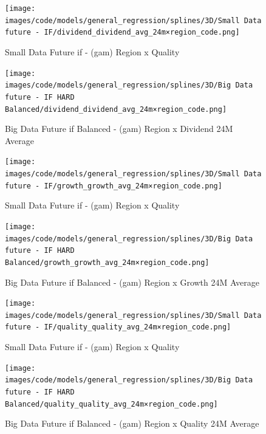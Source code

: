 \documentclass[11pt,english,a4paper,hidelinks]{book}
\begin{document}
\begin{figure}[H]
    \centering
    \begin{minipage}{0.48\textwidth}
        \centering
        \texttt{[image: images/code/models/general\_regression/splines/3D/Small Data future - IF/dividend\_dividend\_avg\_24m×region\_code.png]}
        \caption{Small Data Future \acrshort{if} - (\acrshort{gam}) Region x Quality}
        \label{fig:small_tensor_region_dividend_avg_24m}
    \end{minipage}
    \begin{minipage}{0.48\textwidth}
        \centering
        \texttt{[image: images/code/models/general\_regression/splines/3D/Big Data future - IF HARD Balanced/dividend\_dividend\_avg\_24m×region\_code.png]}
        \caption{Big Data Future \acrshort{if} Balanced - (\acrshort{gam}) Region x Dividend 24M Average}
        \label{fig:tensor_region_dividend_avg_24m}
    \end{minipage}\hfill
\end{figure}

\begin{figure}[H]
    \centering
    \begin{minipage}{0.48\textwidth}
        \centering
        \texttt{[image: images/code/models/general\_regression/splines/3D/Small Data future - IF/growth\_growth\_avg\_24m×region\_code.png]}
        \caption{Small Data Future \acrshort{if} - (\acrshort{gam}) Region x Quality}
        \label{fig:small_tensor_region_growth_avg_24m}
    \end{minipage}
    \begin{minipage}{0.48\textwidth}
        \centering
        \texttt{[image: images/code/models/general\_regression/splines/3D/Big Data future - IF HARD Balanced/growth\_growth\_avg\_24m×region\_code.png]}
        \caption{Big Data Future \acrshort{if} Balanced - (\acrshort{gam}) Region x Growth 24M Average}
        \label{fig:tensor_region_growth_avg_24m}
    \end{minipage}\hfill
\end{figure}

\begin{figure}[H]
    \centering
    \begin{minipage}{0.48\textwidth}
        \centering
        \texttt{[image: images/code/models/general\_regression/splines/3D/Small Data future - IF/quality\_quality\_avg\_24m×region\_code.png]}
        \caption{Small Data Future \acrshort{if} - (\acrshort{gam}) Region x Quality}
        \label{fig:small_tensor_region_quality_avg_24m}
    \end{minipage}
    \begin{minipage}{0.48\textwidth}
        \centering
        \texttt{[image: images/code/models/general\_regression/splines/3D/Big Data future - IF HARD Balanced/quality\_quality\_avg\_24m×region\_code.png]}
        \caption{Big Data Future \acrshort{if} Balanced - (\acrshort{gam}) Region x Quality 24M Average}
        \label{fig:tensor_region_quality_avg_24m}
    \end{minipage}\hfill
\end{figure}
\end{document}
